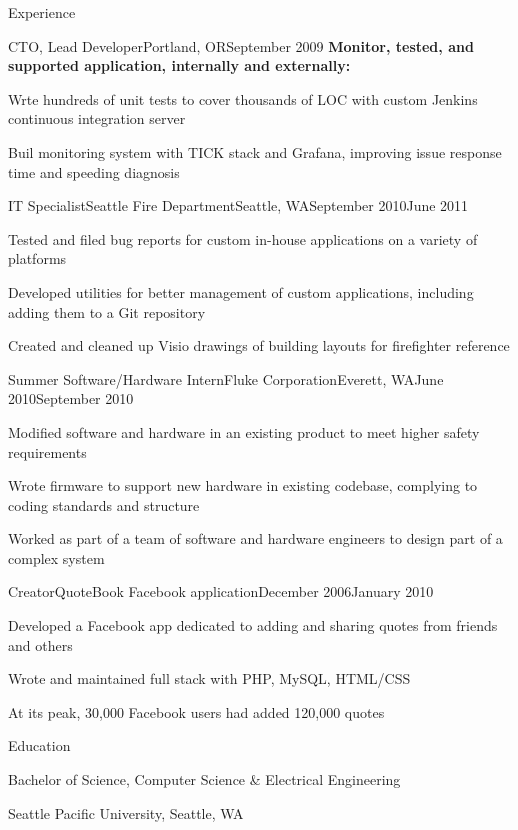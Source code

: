 \documentclass[letterpaper,10pt]{article}
\let\pt\pasttense
\let\anon\anonno
\begin{document}
\begin{res_section}{Experience}
\begin{res_experienceitem}{CTO, Lead Developer}{\anon{SERPs.com}{SaaSCo}}{Portland, OR}{September 2009}{{\pt[Present]{March 2017}}}
  \nonitem \textbf{Monitor\pt{ed}, tested, and supported application, internally and externally:}
  \item Wr\pt[i]{o}te hundreds of unit tests to cover thousands of LOC with custom Jenkins continuous integration server
  \item Buil\pt[d]{t} monitoring system with TICK stack and Grafana, improving issue response time and speeding diagnosis
\end{res_experienceitem}
\begin{res_experienceitem}{IT Specialist}{Seattle Fire Department}{Seattle, WA}{September 2010}{June 2011}
  \item Tested and filed bug reports for custom in-house applications on a variety of platforms
  \item Developed utilities for better management of custom applications, including adding them to a Git repository
  \item Created and cleaned up Visio drawings of building layouts for firefighter reference
\end{res_experienceitem}
\begin{res_experienceitem}{Summer Software/Hardware Intern}{Fluke Corporation}{Everett, WA}{June 2010}{September 2010}
  \item Modified software and hardware in an existing product to meet higher safety requirements
  \item Wrote firmware to support new hardware in existing codebase, complying to coding standards and structure
  \item Worked as part of a team of software and hardware engineers to design part of a complex system
\end{res_experienceitem}
\begin{res_experienceitem}{Creator}{QuoteBook Facebook application}{}{December 2006}{January 2010}
  \item Developed a Facebook app dedicated to adding and sharing quotes from friends and others
  \item Wrote and maintained full stack with PHP, MySQL, HTML/CSS
  \item At its peak, 30,000 Facebook users had added 120,000 quotes
\end{res_experienceitem}
\end{res_section}

\begin{res_section}{Education}
\begin{res_subsection}{Bachelor of Science, Computer Science \& Electrical Engineering}
    \item Seattle Pacific University, Seattle, WA
\end{res_subsection}
\end{res_section}
\end{document}
